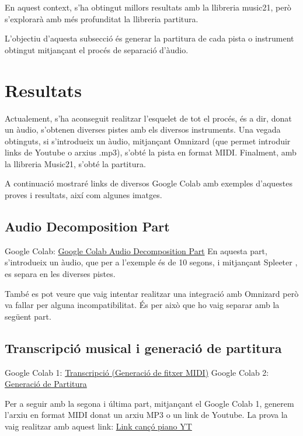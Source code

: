 \documentclass[10pt,a4paper,twocolumn,twoside]{article}
\begin{document}
En aquest context, s'ha obtingut millors resultats amb la llibreria music21, però s'explorarà amb més profunditat la llibreria partitura.

L'objectiu d'aquesta subsecció és generar la partitura de cada pista o instrument obtingut mitjançant el procés de separació d'àudio.


\section{Resultats}

Actualement, s'ha aconseguit realitzar l'esquelet de tot el procés, és a dir, donat un àudio, s'obtenen diverses pistes amb els diversos instruments. Una vegada obtinguts, si s'introdueix un àudio, mitjançant Omnizard (que permet introduir links de Youtube o arxius .mp3), s'obté la pista en format MIDI. Finalment, amb la llibreria Music21, s'obté la partitura.

A continuació mostraré links de diversos Google Colab amb exemples d'aquestes proves i resultats, així com algunes imatges.

\subsection{Audio Decomposition Part}

Google Colab: \href{https://colab.research.google.com/drive/1hnlwqaULE_wZDV8ZtSGldOrITDW8WQJs?usp=sharing}{Google Colab Audio Decomposition Part}
En aquesta part, s'introdueix un àudio, que per a l'exemple és de 10 segons, i mitjançant Spleeter \cite{spleeter2020}, es separa en les diverses pistes.

També es pot veure que vaig intentar realitzar una integració amb Omnizard però va fallar per alguna incompatibilitat. És per això que ho vaig separar amb la següent part.

\subsection{Transcripció musical i generació de partitura}

Google Colab 1: \href{https://colab.research.google.com/drive/1W1kDEtN0w8kRLiUZLePwhXBxqFlJAA4x?usp=sharing}{Transcripció (Generació de fitxer MIDI)}
Google Colab 2: \href{https://colab.research.google.com/drive/1tiGLzMGYfOxaYQx5lRwElC0yLjdWvwAU?usp=sharing}{Generació de Partitura}

Per a seguir amb la segona i última part, mitjançant el Google Colab 1, generem l'arxiu en format MIDI donat un arxiu MP3 o un link de Youtube.
La prova la vaig realitzar amb aquest link: \href{https://www.youtube.com/watch?v=aCUI6dNECeA&ab_channel=tocapartituras.com}{Link cançó piano YT}
\end{document}
